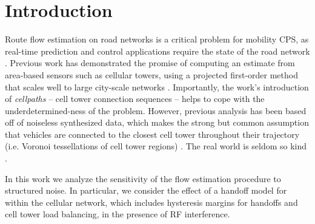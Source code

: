 
\section{Introduction}
Route flow estimation on road networks is a critical problem for mobility CPS, as real-time prediction and control applications require the state of the road network \cite{Faouzi2011,Mathew2014}. Previous work has demonstrated the promise of computing an estimate from area-based sensors such as cellular towers, using a projected first-order method that scales well to large city-scale networks \cite{Wu2015}. Importantly, the work's introduction of \textit{cellpaths} -- cell tower connection sequences -- helps to cope with the underdetermined-ness of the problem. However, previous analysis has been based off of noiseless synthesized data, which makes the strong but common assumption that vehicles are connected to the closest cell tower throughout their trajectory (i.e. Voronoi tessellations of cell tower regions) \cite{Voronoi1908}. The real world is seldom so kind \cite{Caceres2013}.

In this work we analyze the sensitivity of the flow estimation procedure to structured noise. In particular, we consider the effect of a handoff model for within the cellular network, which includes hysteresis margins for handoffs and cell tower load balancing, in the presence of RF interference.
